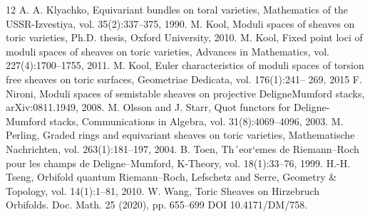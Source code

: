 \documentclass[10pt]{amsart}
\numberwithin{equation}{subsection}
\begin{document}
\begin{thebibliography}{12}
A. A. Klyachko, Equivariant bundles on toral varieties, Mathematics of the USSR-Izvestiya, vol. 35(2):337–375, 1990.
M. Kool, Moduli spaces of sheaves on toric varieties, Ph.D. thesis, Oxford University, 2010.
M. Kool, Fixed point loci of moduli spaces of sheaves on toric varieties, Advances in Mathematics, vol. 227(4):1700–1755, 2011.
M. Kool, Euler characteristics of moduli spaces of torsion free sheaves on toric surfaces, Geometriae Dedicata, vol. 176(1):241–
269, 2015
F. Nironi, Moduli spaces of semistable sheaves on projective DeligneMumford stacks, arXiv:0811.1949, 2008.
 M. Olsson and J. Starr, Quot functors for Deligne-Mumford stacks, Communications in Algebra, vol. 31(8):4069–4096, 2003.
M. Perling, Graded rings and equivariant sheaves on toric varieties, Mathematische Nachrichten, vol. 263(1):181–197, 2004.
B. Toen, Th´eor`emes de Riemann–Roch pour les champs de Deligne–Mumford, K-Theory, vol. 18(1):33–76, 1999.
H.-H. Tseng, Orbifold quantum Riemann–Roch, Lefschetz and
Serre, Geometry \& Topology, vol. 14(1):1–81, 2010.
 W. Wang, Toric Sheaves on Hirzebruch Orbifolds. Doc. Math. 25 (2020), pp. 655–699 DOI 10.4171/DM/758.
\end{thebibliography}
\end{document}
